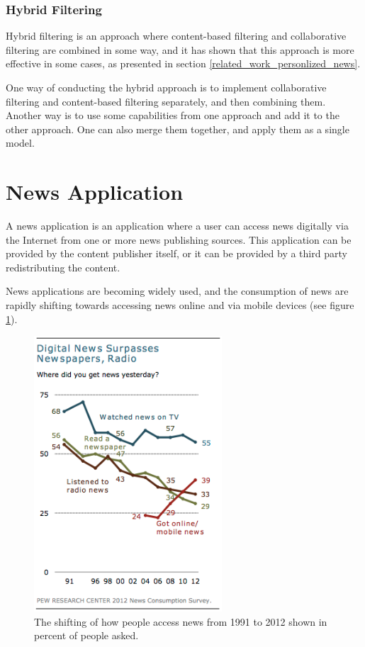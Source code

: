 \subsubsection{Hybrid Filtering}
Hybrid filtering is an approach where content-based filtering and collaborative filtering are combined in some way, and it has shown that this approach is more effective in some cases, as presented in section \ref{related_work_personlized_news}.

One way of conducting the hybrid approach is to implement collaborative filtering and content-based filtering separately, and then combining them. Another way is to use some capabilities from one approach and add it to the other approach. One can also merge them together, and apply them as a single model.

\section{News Application}
A news application is an application where a user can access news digitally via the Internet from one or more news publishing sources. This application can be provided by the content publisher itself, or it can be provided by a third party redistributing the content.

News applications are becoming widely used, and the consumption of news are rapidly shifting towards accessing news online and via mobile devices (see figure \ref{pew_news_consumption_survey}).

\begin{figure}[!htbp]
\centering
\includegraphics[width=70mm]{GFX/tech/pewNewsConsumptionSurvey.png}
\caption{The shifting of how people access news from 1991 to 2012 shown in percent of people asked.}
\label{pew_news_consumption_survey}
\end{figure}

